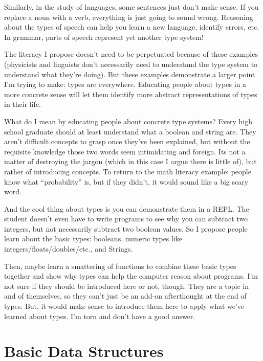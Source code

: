 \documentclass[12pt]{article}
\begin{document}

      Similarly, in the study of languages, some sentences just don't make sense. If you replace a noun with a verb, everything is just going to sound wrong. Reasoning about the types of speech can help you learn a new language, identify errors, etc. In grammar, parts of speech represent yet another type system! 

      The literacy I propose doesn't need to be perpetuated because of these examples (physicists and linguists don't necessarily need to understand the type system to understand what they're doing). But these examples demonstrate a larger point I'm trying to make: types are everywhere. Educating people about types in a more concrete sense will let them identify more abstract representations of types in their life. 

      What do I mean by educating people about concrete type systems? Every high school graduate should at least understand what a boolean and string are. They aren't difficult concepts to grasp once they've been explained, but without the requisite knowledge those two words seem intimidating and foreign. Its not a matter of destroying the jargon (which in this case I argue there is little of), but rather of introducing concepts. To return to the math literacy example: people know what ``probability'' is, but if they didn't, it would sound like a big scary word. 

      And the cool thing about types is you can demonstrate them in a REPL. The student doesn't even have to write programs to see why you can subtract two integers, but not necessarily subtract two boolean values. So I propose people learn about the basic types: booleans, numeric types like integers/floats/doubles/etc., and Strings. 

      Then, maybe learn a smattering of functions to combine these basic types together and show why types can help the computer reason about programs. I'm not sure if they should be introduced here or not, though. They are a topic in and of themselves, so they can't just be an add-on afterthought at the end of types. But, it would make sense to introduce them here to apply what we've learned about types. I'm torn and don't have a good answer. 

    \section{Basic Data Structures}
\end{document}
